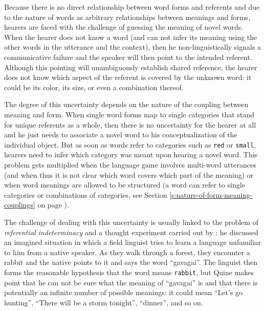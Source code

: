Because there is no direct relationship between word forms and
referents and due to the nature of words as arbitrary relationships
between meanings and forms, hearers are faced with the challenge of
guessing the meaning of novel words. When the hearer does not know a
word (and can not infer its meaning using the other words in the
utterance and the context), then he non-linguistically signals a
communicative failure and the speaker will then point to the intended
referent. Although this pointing will unambiguously establish shared
reference, the hearer does not know which aspect of the referent is
covered by the unknown word: it could be its color, its size, or even
a combination thereof.

The degree of this uncertainty depends on the nature of the
coupling between meaning and form. When single word forms map to
single categories that stand for unique referents as a whole, then
there is no uncertainty for the hearer at all and he just needs to
associate a novel word to his conceptualization of the individual
object. But as soon as words refer to categories such as \texttt{red}
or \texttt{small}, hearers need to infer which category was meant upon
hearing a novel word. This problem gets multiplied when the language
game involves multi-word utterances (and when thus it is not clear
which word covers which part of the meaning) or when word meanings are
allowed to be structured (a word can refer to single categories or
combinations of categories, see Section
\ref{s:nature-of-form-meaning-couplings} on page
\pageref{s:nature-of-form-meaning-couplings}).


The challenge of dealing with this uncertainty is usually linked to
the problem of \emph{referential indeterminacy} and a thought
experiment carried out by \cite{quine60word}: he discussed an imagined
situation in which a field linguist tries to learn a language
unfamiliar to him from a native speaker. As they walk through a
forest, they encounter a rabbit and the native points to it and says
the word ``gavagai''. The linguist then forms the reasonable
hypothesis that the word means \texttt{rabbit}, but Quine makes point
that he can not be sure what the meaning of ``gavagai'' is and that
there is potentially an infinite number of possible meanings: it could
mean ``Let's go hunting'', ``There will be a storm tonight'', ``dinner'',
and so on.


